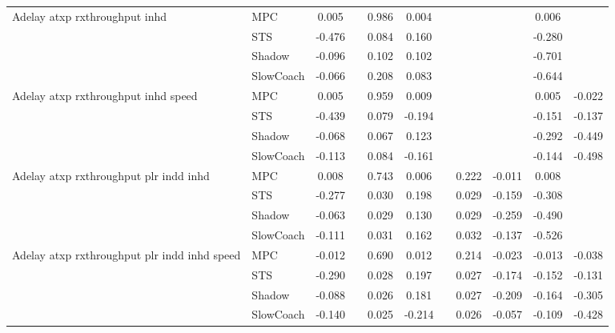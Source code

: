 \begin{tabular}{|l|l|*{9}{c|}}
\midrule
Adelay atxp rxthroughput inhd    & MPC &    0.005 &        &     0.986 &  0.004 &     &     &      &   0.006 &       \\
                              & STS &   -0.476 &        &     0.084 &  0.160 &     &     &      &  -0.280 &       \\
                              & Shadow &   -0.096 &        &     0.102 &  0.102 &     &     &      &  -0.701 &       \\
                              & SlowCoach &   -0.066 &        &     0.208 &  0.083 &     &     &      &  -0.644 &       \\
\midrule
Adelay atxp rxthroughput inhd speed    & MPC &    0.005 &        &     0.959 &  0.009 &     &     &      &   0.005 &   -0.022 \\
                              & STS &   -0.439 &        &     0.079 & -0.194 &     &     &      &  -0.151 &   -0.137 \\
                              & Shadow &   -0.068 &        &     0.067 &  0.123 &     &     &      &  -0.292 &   -0.449 \\
                              & SlowCoach &   -0.113 &        &     0.084 & -0.161 &     &     &      &  -0.144 &   -0.498 \\
\midrule
Adelay atxp rxthroughput plr indd inhd    & MPC &    0.008 &        &     0.743 &  0.006 &     &  0.222 &  -0.011 &   0.008 &       \\
                              & STS &   -0.277 &        &     0.030 &  0.198 &     &  0.029 &  -0.159 &  -0.308 &       \\
                              & Shadow &   -0.063 &        &     0.029 &  0.130 &     &  0.029 &  -0.259 &  -0.490 &       \\
                              & SlowCoach &   -0.111 &        &     0.031 &  0.162 &     &  0.032 &  -0.137 &  -0.526 &       \\
\midrule
Adelay atxp rxthroughput plr indd inhd speed    & MPC &   -0.012 &        &     0.690 &  0.012 &     &  0.214 &  -0.023 &  -0.013 &   -0.038 \\
                              & STS &   -0.290 &        &     0.028 &  0.197 &     &  0.027 &  -0.174 &  -0.152 &   -0.131 \\
                              & Shadow &   -0.088 &        &     0.026 &  0.181 &     &  0.027 &  -0.209 &  -0.164 &   -0.305 \\
                              & SlowCoach &   -0.140 &        &     0.025 & -0.214 &     &  0.026 &  -0.057 &  -0.109 &   -0.428 \\

\end{tabular}
